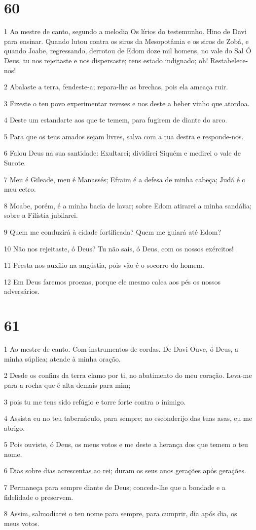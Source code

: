 \chapter{60}

\par 1 Ao mestre de canto, segundo a melodia Os lírios do testemunho. Hino de Davi para ensinar. Quando lutou contra os siros da Mesopotâmia e os siros de Zobá, e quando Joabe, regressando, derrotou de Edom doze mil homens, no vale do Sal Ó Deus, tu nos rejeitaste e nos dispersaste; tens estado indignado; oh! Restabelece-nos!
\par 2 Abalaste a terra, fendeste-a; repara-lhe as brechas, pois ela ameaça ruir.
\par 3 Fizeste o teu povo experimentar reveses e nos deste a beber vinho que atordoa.
\par 4 Deste um estandarte aos que te temem, para fugirem de diante do arco.
\par 5 Para que os teus amados sejam livres, salva com a tua destra e responde-nos.
\par 6 Falou Deus na sua santidade: Exultarei; dividirei Siquém e medirei o vale de Sucote.
\par 7 Meu é Gileade, meu é Manassés; Efraim é a defesa de minha cabeça; Judá é o meu cetro.
\par 8 Moabe, porém, é a minha bacia de lavar; sobre Edom atirarei a minha sandália; sobre a Filístia jubilarei.
\par 9 Quem me conduzirá à cidade fortificada? Quem me guiará até Edom?
\par 10 Não nos rejeitaste, ó Deus? Tu não sais, ó Deus, com os nossos exércitos!
\par 11 Presta-nos auxílio na angústia, pois vão é o socorro do homem.
\par 12 Em Deus faremos proezas, porque ele mesmo calca aos pés os nossos adversários.

\chapter{61}

\par 1 Ao mestre de canto. Com instrumentos de cordas. De Davi Ouve, ó Deus, a minha súplica; atende à minha oração.
\par 2 Desde os confins da terra clamo por ti, no abatimento do meu coração. Leva-me para a rocha que é alta demais para mim;
\par 3 pois tu me tens sido refúgio e torre forte contra o inimigo.
\par 4 Assista eu no teu tabernáculo, para sempre; no esconderijo das tuas asas, eu me abrigo.
\par 5 Pois ouviste, ó Deus, os meus votos e me deste a herança dos que temem o teu nome.
\par 6 Dias sobre dias acrescentas ao rei; duram os seus anos gerações após gerações.
\par 7 Permaneça para sempre diante de Deus; concede-lhe que a bondade e a fidelidade o preservem.
\par 8 Assim, salmodiarei o teu nome para sempre, para cumprir, dia após dia, os meus votos.

